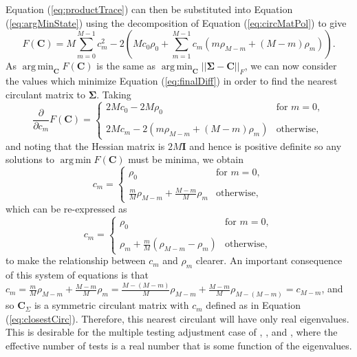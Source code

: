 \documentclass[letterpaper,12pt,oneside,final]{article}
\newcommand{\m}[1]{\mathbf{#1}}               %
\newcommand{\sm}[1]{\boldsymbol{#1}}   %
\newcommand{\norm}[1]{||{#1}||}              %
\newcommand{\frob}[1]{\norm{#1}_F}
\DeclareMathOperator*{\argmin}{arg\,min}
\begin{document}
Equation (\ref{eq:productTrace}) can then be substituted into Equation (\ref{eq:argMinState}) using the decomposition of Equation (\ref{eq:circMatPol}) to give
\begin{equation} \label{eq:finalDiff}
  F(\m{C}) = M \sum_{m=0}^{M-1} c_m^2 - 2 \left ( M c_0 \rho_0 + \sum_{m=1}^{M-1} c_m (m \rho_{M-m} + (M - m) \rho_m) \right ).
\end{equation}
As $\argmin_{\m{C}} F(\m{C})$ is the same as $\argmin_{\m{C}} \frob{\sm{\Sigma} - \m{C}}$, we can now consider the values which minimize Equation (\ref{eq:finalDiff}) in order to find the nearest circulant matrix to $\sm{\Sigma}$. Taking
\begin{equation*} 
  \frac{\partial}{\partial c_m} F(\m{C}) = \begin{cases}
    2Mc_0 - 2M\rho_0 & \text{for } m = 0, \\
    & \\
    2Mc_m - 2 \left ( m \rho_{M-m} + (M - m) \rho_m \right ) & \text{otherwise},
  \end{cases}
\end{equation*}
and noting that the Hessian matrix is $2M\m{I}$ and hence is positive definite so any solutions to $\argmin F(\m{C})$ must be minima, we obtain
\begin{equation*}
  c_m = \begin{cases}
    \rho_0 & \text{for } m = 0, \\
    & \\
    \frac{m}{M} \rho_{M-m} + \frac{M-m}{M} \rho_m & \text{otherwise},
  \end{cases}
\end{equation*}
which can be re-expressed as
\begin{equation} \label{eq:closestCirc}
  c_m = \begin{cases}
    \rho_0 & \text{for } m = 0, \\
    & \\
    \rho_m + \frac{m}{M}(\rho_{M-m} - \rho_m) & \text{otherwise},
  \end{cases}
\end{equation}
to make the relationship between $c_m$ and $\rho_m$ clearer. An important consequence of this system of equations is that $c_m = \frac{m}{M} \rho_{M-m} + \frac{M-m}{M} \rho_m = \frac{M - (M - m)}{M} \rho_{M-m} + \frac{M - m}{M} \rho_{M - (M - m)} = c_{M-m}$, and so $\m{C}_{\Sigma}$ is a symmetric circulant matrix with $c_m$ defined as in Equation (\ref{eq:closestCirc}). Therefore, this nearest circulant will have only real eigenvalues. This is desirable for the multiple testing adjustment case of \cite{cheverud2001}, \cite{LiJi2005}, and \cite{Galwey2009}, where the effective number of tests is a real number that is some function of the eigenvalues.
\end{document}

